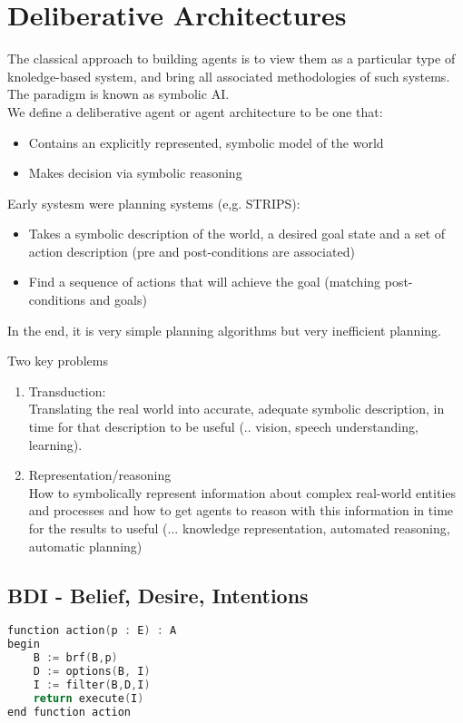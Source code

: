 \section{Deliberative Architectures}
The classical approach to building agents is to view them as a particular type of knoledge-based system, and bring all associated methodologies of such systems.\\
The paradigm is known as symbolic AI.\\
We define a deliberative agent or agent architecture to be one that:
\begin{itemize}
\item Contains an explicitly represented, symbolic model of the world
\item Makes decision via symbolic reasoning
\end{itemize}

Early systesm were planning systems (e,g. STRIPS):
\begin{itemize}
\item Takes a symbolic description of the world, a desired goal state and a set of action description (pre and post-conditions are associated)
\item Find a sequence of actions that will achieve the goal (matching post-conditions and goals)
\end{itemize}
In the end, it is very simple planning algorithms but very inefficient planning.

Two key problems
\begin{enumerate}
\item Transduction:\\
Translating the real world into accurate, adequate symbolic description, in time for that description to be useful (.. vision, speech understanding, learning).
\item Representation/reasoning\\
How to symbolically represent information about complex real-world entities and processes and how to get agents to reason with this information in time for the results to useful (... knowledge representation, automated reasoning, automatic planning)
\end{enumerate}
\subsection{BDI - Belief, Desire, Intentions}
\begin{lstlisting}[language=C++]
function action(p : E) : A
begin
	B := brf(B,p)
	D := options(B, I)
	I := filter(B,D,I)
	return execute(I)
end function action
\end{lstlisting}
